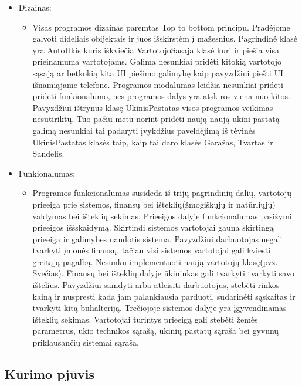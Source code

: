 \documentclass[oneside]{VUMIFPSkursinis}
\begin{document}
	\begin{itemize}
		\item Dizainas:
			\begin{itemize}
				\item Visas programos dizainas paremtas Top to bottom principu. Pradėjome galvoti dideliais obijektais ir juos išskirstėm į mažesnius. Pagrindinė klasė yra AutoUkis kuris iškviečia VartotojoSasaja klasė kuri ir piešia visa prieinamuma vartotojams. Galima nesunkiai pridėti kitokią vartotojo sąsają ar betkokią kita UI piešimo galimybę kaip pavyzdžiui piešti UI išnamiąjame telefone. Programos modalumas leidžia nesunkiai pridėti pridėti funkionalumo, nes programos dalys yra atskiros viena nuo kitos. Pavyzdžiui ištrynus klasę ŪkinisPastatas visos programos veikimas nesutiriktų. Tuo pačiu metu norint pridėti naują naują ūkini pastatą galimą nesunkiai tai padaryti įvykdžius paveldėjimą iš tėvinės UkinisPastatas klasės taip, kaip tai daro klasės Garažas, Tvartas ir Sandelis.  
			\end{itemize}
		\item Funkionalumas: 
			\begin{itemize}
				\item Programos funkcionalumas susideda iš trijų pagrindinių dalių, vartotojų prieeiga prie sistemos, finansų bei išteklių(žmogiškųjų ir natūrliųjų) valdymas bei išteklių sekimas. Prieeigos dalyje funkcionalumas pasižymi prieeigos iššskaidymą. Skirtindi sistemos vartotojai gauna skirtingą prieeiga ir galimybes naudotis sistema. Pavyzdžiui darbuotojas negali tvarkyti įmonės finansų, tačiau visi sistemos vartotojai gali kviesti greitąją pagalbą. Nesunku implementuoti naują vartotojų klasę(pvz. Svečias). Finansų bei išteklių dalyje ūkininkas gali tvarkyti tvarkyti savo ištelius. Pavyzdžiui samdyti arba atleisiti darbuotojus, stebėti rinkos kainą ir nuspresti kada jam palankiausia parduoti, sudarinėti sąskaitas ir tvarkyti kitą buhalteriją. Trečiojoje sistemos dalyje yra įgyvendinamas išteklių sekimas. Vartotojai turintys prieeigą gali stebėti žemės parametrus, ūkio technikos sąrašą, ūkinių pastatų sąraša bei gyvūnų priklausančių sistemai sąraša.
			\end{itemize}

	\end{itemize}


\subsection{Kūrimo pjūvis}
	
\end{document}
